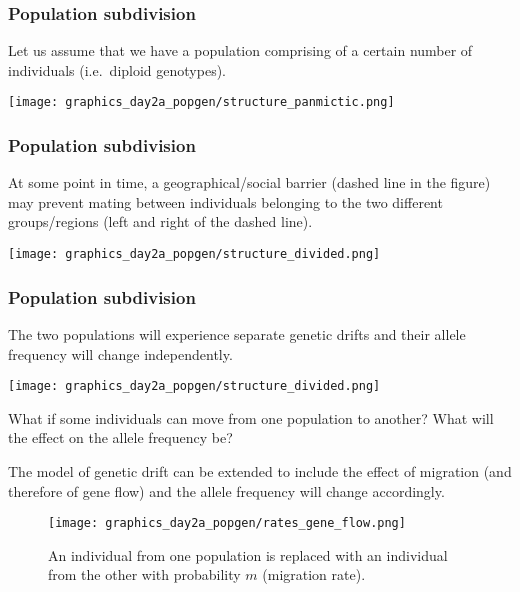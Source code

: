 \documentclass{beamer}
\newcommand{\1}{\ensuremath{\mathbf{1}}}
\begin{document}
%
%
%
\begin{frame}\frametitle{Population subdivision}
	Let us assume that we have a population comprising of a certain number of individuals (i.e.\ diploid genotypes).
	\begin{center}
		\texttt{[image: graphics\_day2a\_popgen/structure\_panmictic.png]}
	\end{center}
\end{frame}
%
%
%
\begin{frame}\frametitle{Population subdivision}
	At some point in time, a geographical/social barrier (dashed line in the figure) may prevent mating between individuals belonging to the two different groups/regions (left and right of the dashed line).
	\begin{center}
		\texttt{[image: graphics\_day2a\_popgen/structure\_divided.png]}
	\end{center}
\end{frame}
%
%
%
\begin{frame}\frametitle{Population subdivision}
	The two populations will experience separate genetic drifts and their allele frequency will change independently.
	\begin{center}
		\texttt{[image: graphics\_day2a\_popgen/structure\_divided.png]}
	\end{center}
	What if some individuals can move from one population to another? What will the effect on the allele frequency be?
\end{frame}
%
%
%
\begin{frame}
	The model of genetic drift can be extended to include the effect of migration (and therefore of gene flow) and the allele frequency will change accordingly.
	\begin{figure}
	\begin{center}
		\texttt{[image: graphics\_day2a\_popgen/rates\_gene\_flow.png]}
	\end{center}
	\caption{An individual from one population is replaced with an individual from the other with probability $m$ (migration rate).}
	\end{figure}
\end{frame}
\end{document}
